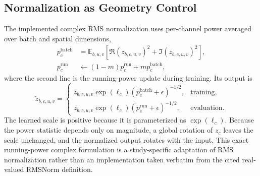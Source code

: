 \subsection{Normalization as Geometry Control}
The implemented complex RMS normalization uses per-channel power averaged over batch and spatial dimensions,
\begin{align}
p_c^{\mathrm{batch}}&=\mathbb{E}_{b,u,v}\!\left[\Re(z_{b,c,u,v})^2+\Im(z_{b,c,u,v})^2\right],\\
p_c^{\mathrm{run}}&\leftarrow(1-m)p_c^{\mathrm{run}}+m p_c^{\mathrm{batch}},
\end{align}
where the second line is the running-power update during training. Its output is
\begin{equation}
\widetilde z_{b,c,u,v}=\begin{cases}
z_{b,c,u,v}\exp(\ell_c)(p_c^{\mathrm{batch}}+\epsilon)^{-1/2},&\text{training},\\
z_{b,c,u,v}\exp(\ell_c)(p_c^{\mathrm{run}}+\epsilon)^{-1/2},&\text{evaluation}.
\end{cases}
\label{eq:rmsnorm-general}
\end{equation}
The learned scale is positive because it is parameterized as $\exp(\ell_c)$. Because the power statistic depends only on magnitude, a global rotation of $z_c$ leaves the scale unchanged, and the normalized output rotates with the input. This exact running-power complex formulation is a study-specific adaptation of RMS normalization rather than an implementation taken verbatim from the cited real-valued RMSNorm definition.

